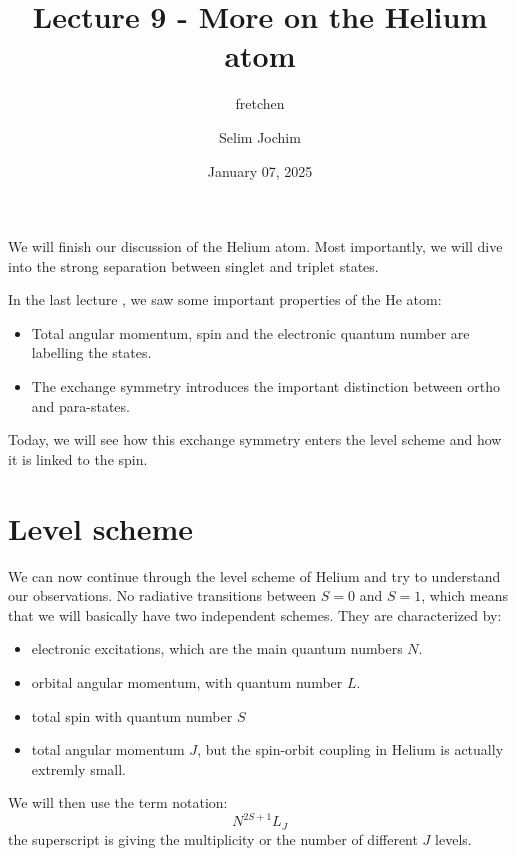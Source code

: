 \documentclass[10pt]{article}
\let\cite\citep
\renewenvironment{abstract}
  {{\bfseries\noindent{\abstractname}\par\nobreak}\footnotesize}
  {\bigskip}
\providecommand\citep{\cite}
\begin{document}
\title{Lecture 9 - More on the Helium atom}



\author[1]{fretchen}%
\author[2]{Selim Jochim}%
%
%


\vspace{-1em}



  
  \date{January 07, 2025}


\begingroup
\let\center\flushleft
\let\endcenter\endflushleft
\maketitle
\endgroup





\begin{abstract}
We will finish our discussion of the Helium atom. Most importantly, we will dive into the strong separation between singlet and triplet states.%
\end{abstract}%



\sloppy


In the last lecture \cite{Jendrzejewski}, we saw some important properties of the He atom:
\begin{itemize}
\item Total angular momentum, spin and the electronic quantum number are labelling the states.
\item The exchange symmetry introduces the important distinction between ortho and para-states.
\end{itemize}
Today, we will see how this exchange symmetry enters the level scheme and how it is linked to the spin. 

\section{Level scheme}

We can now continue through the level scheme of Helium and try to understand our observations. No radiative transitions between $S=0$ and $S=1$, which means that we will basically have two independent schemes. They are characterized by:
\begin{itemize}
\item electronic excitations, which are the main quantum numbers $N$.
\item orbital angular momentum, with quantum number $L$.
\item total spin with quantum number $S$
\item total angular momentum $J$, but the spin-orbit coupling in Helium is actually extremly small.
\end{itemize}
We will then use the term notation:
\begin{equation}
N ^{2S+1}L_J
\end{equation}
the superscript is giving the multiplicity or the number of different $J$ levels. 
\end{document}
